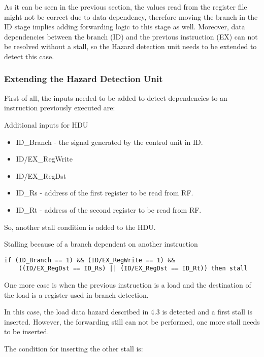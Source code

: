 \documentclass[a4paper,12pt]{report}
\begin{document}
As it can be seen in the previous section, the values read from the register file might not be correct due to data dependency, therefore moving the branch in the ID stage implies adding forwarding logic to this stage as well. Moreover, data dependencies between the branch (ID) and the previous instruction (EX) can not be resolved without a stall, so the Hazard detection unit needs to be extended to detect this case.

\subsubsection{Extending the Hazard Detection Unit} 
First of all, the inputs needed to be added to detect dependencies to an instruction previously executed are:

\begin{my-list}{Additional inputs for HDU}
    \begin{itemize}
        \item ID\_Branch - the signal generated by the control unit in ID.
        \item ID/EX\_RegWrite
        \item ID/EX\_RegDst
        \item ID\_Rs - address of the first register to be read from RF.
        \item ID\_Rt - address of the second register to be read from RF.
    \end{itemize}
\end{my-list}

So, another stall condition is added to the HDU.

\begin{my-listing}{Stalling because of a branch dependent on another instruction}
    \begin{lstlisting}[style=vhdl]
if (ID_Branch == 1) && (ID/EX_RegWrite == 1) &&
    ((ID/EX_RegDst == ID_Rs) || (ID/EX_RegDst == ID_Rt)) then stall
    \end{lstlisting}
\end{my-listing}

One more  case is when the previous instruction is a load and the destination of the load is a register used in branch detection. 

In this case, the load data hazard described in 4.3 is detected and a first stall is inserted. However, the forwarding still can not be performed, one more stall needs to be inserted.

The condition for inserting the other stall is:
\end{document}
